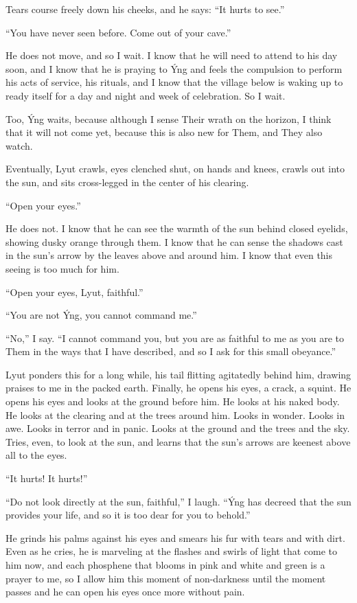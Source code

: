 Tears course freely down his cheeks, and he says: ``It hurts to see.''

``You have never seen before. Come out of your cave.''

He does not move, and so I wait. I know that he will need to attend to his day soon, and I know that he is praying to Ýng and feels the compulsion to perform his acts of service, his rituals, and I know that the village below is waking up to ready itself for a day and night and week of celebration. So I wait.

Too, Ýng waits, because although I sense Their wrath on the horizon, I think that it will not come yet, because this is also new for Them, and They also watch.

Eventually, Lyut crawls, eyes clenched shut, on hands and knees, crawls out into the sun, and sits cross-legged in the center of his clearing.

``Open your eyes.''

He does not. I know that he can see the warmth of the sun behind closed eyelids, showing dusky orange through them. I know that he can sense the shadows cast in the sun's arrow by the leaves above and around him. I know that even this seeing is too much for him.

``Open your eyes, Lyut, faithful.''

``You are not Ýng, you cannot command me.''

``No,'' I say. ``I cannot command you, but you are as faithful to me as you are to Them in the ways that I have described, and so I ask for this small obeyance.''

Lyut ponders this for a long while, his tail flitting agitatedly behind him, drawing praises to me in the packed earth. Finally, he opens his eyes, a crack, a squint. He opens his eyes and looks at the ground before him. He looks at his naked body. He looks at the clearing and at the trees around him. Looks in wonder. Looks in awe. Looks in terror and in panic. Looks at the ground and the trees and the sky. Tries, even, to look at the sun, and learns that the sun's arrows are keenest above all to the eyes.

``It hurts! It hurts!''

``Do not look directly at the sun, faithful,'' I laugh. ``Ýng has decreed that the sun provides your life, and so it is too dear for you to behold.''

He grinds his palms against his eyes and smears his fur with tears and with dirt. Even as he cries, he is marveling at the flashes and swirls of light that come to him now, and each phosphene that blooms in pink and white and green is a prayer to me, so I allow him this moment of non-darkness until the moment passes and he can open his eyes once more without pain.

